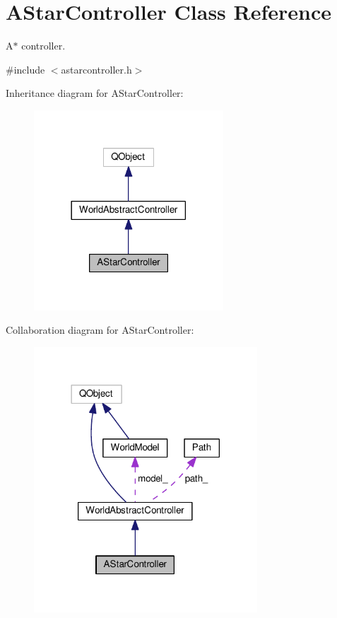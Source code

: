 \hypertarget{classAStarController}{}\section{A\+Star\+Controller Class Reference}
\label{classAStarController}


A$\ast$ controller.  




{\ttfamily \#include $<$astarcontroller.\+h$>$}



Inheritance diagram for A\+Star\+Controller\+:\nopagebreak
\begin{figure}[H]
\begin{center}
\leavevmode
\includegraphics[width=201pt]{d5/dde/classAStarController__inherit__graph}
\end{center}
\end{figure}


Collaboration diagram for A\+Star\+Controller\+:\nopagebreak
\begin{figure}[H]
\begin{center}
\leavevmode
\includegraphics[width=237pt]{d1/dda/classAStarController__coll__graph}
\end{center}
\end{figure}
